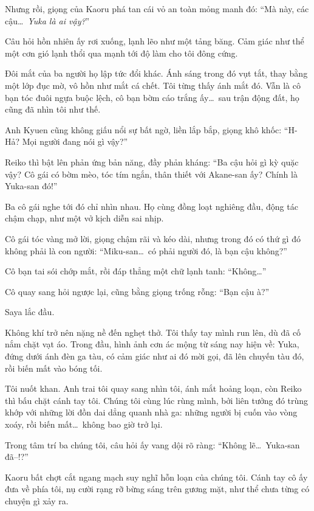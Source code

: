 \documentclass[../main.tex]{subfiles}
\begin{document}
Nhưng rồi, giọng của Kaoru phá tan cái vỏ an toàn mỏng manh đó: ``Mà này, các cậu\dots\ \emph{Yuka là ai vậy?}''

Câu hỏi hồn nhiên ấy rơi xuống, lạnh lẽo như một tảng băng. Cảm giác như thể một cơn gió lạnh thổi qua mạnh tới độ làm cho tôi đông cứng.

Đôi mắt của ba người họ lập tức đổi khác. Ánh sáng trong đó vụt tắt, thay bằng một lớp đục mờ, vô hồn như mắt cá chết. Tôi từng thấy ánh mắt đó. Vẫn là cô bạn tóc đuôi ngựa buộc lệch, cô bạn bờm cáo trắng ấy\dots\ sau trận động đất, họ cũng đã nhìn tôi như thế.


Anh Kyuen cũng không giấu nổi sự bất ngờ, liền lắp bắp, giọng khô khốc: ``H-Hả? Mọi người đang nói gì vậy?''

Reiko thì bật lên phản ứng bản năng, đầy phản kháng: ``Ba cậu hỏi gì kỳ quặc vậy? Cô gái có bờm mèo, tóc tím ngắn, thân thiết với Akane-san ấy? Chính là Yuka-san đó!''

Ba cô gái nghe tới đó chỉ nhìn nhau. Họ cùng đồng loạt nghiêng đầu, động tác chậm chạp, như một vở kịch diễn sai nhịp.

Cô gái tóc vàng mở lời, giọng chậm rãi và kéo dài, nhưng trong đó có thứ gì đó không phải là con người: ``Miku-san\dots\ có phải người đó, là bạn cậu không?''

Cô bạn tai sói chớp mắt, rồi đáp thẳng một chữ lạnh tanh: ``Không\dots''

Cô quay sang hỏi ngược lại, cũng bằng giọng trống rỗng: ``Bạn cậu à?''

Saya lắc đầu.

Không khí trở nên nặng nề đến nghẹt thở. Tôi thấy tay mình run lên, dù đã cố nắm chặt vạt áo. Trong đầu, hình ảnh cơn ác mộng từ sáng nay hiện về: Yuka, đứng dưới ánh đèn ga tàu, có cảm giác như ai đó mời gọi, đã lên chuyến tàu đó, rồi biến mất vào bóng tối.

Tôi nuốt khan. Anh trai tôi quay sang nhìn tôi, ánh mắt hoảng loạn, còn Reiko thì bấu chặt cánh tay tôi. Chúng tôi cùng lúc rùng mình, bởi liên tưởng đó trùng khớp với những lời đồn dai dẳng quanh nhà ga: những người bị cuốn vào vòng xoáy, rồi biến mất\dots\ không bao giờ trở lại.

Trong tâm trí ba chúng tôi, câu hỏi ấy vang dội rõ ràng: ``Không lẽ\dots\ Yuka-san đã--!?''

Kaoru bất chợt cắt ngang mạch suy nghĩ hỗn loạn của chúng tôi. Cánh tay cô ấy đưa về phía tôi, nụ cười rạng rỡ bừng sáng trên gương mặt, như thể chưa từng có chuyện gì xảy ra.
\end{document}
